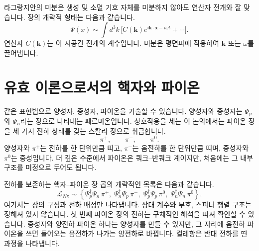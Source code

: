 라그랑지안의 미분은 생성 및 소멸 기호 자체를 미분하지 않아도 연산자 전개와 잘 맞습니다. 장의 개략적 형태는 다음과 같습니다.
\begin{equation}
\Psi(x)
\sim
\int d^3k\,
\bigl[
C(\mathbf k)e^{i\mathbf k\cdot\mathbf x-i\omega t}
+\cdots
\bigr].
\end{equation}
연산자 \(C(\mathbf k)\)는 이 시공간 전개의 계수입니다. 미분은 평면파에 작용하여 \(\mathbf k\) 또는 \(\omega\)를 끌어냅니다.

\begin{classroomqa}
\end{classroomqa}

\section{유효 이론으로서의 핵자와 파이온}

같은 표현법으로 양성자, 중성자, 파이온을 기술할 수 있습니다. 양성자와 중성자는 \(\Psi_p\)와 \(\Psi_n\)라는 장으로 나타내는 페르미온입니다. 상호작용을 세는 이 논의에서는 파이온 장을 세 가지 전하 상태를 갖는 스칼라 장으로 취급합니다.
\begin{equation}
\pi^+,
\qquad
\pi^-,
\qquad
\pi^0.
\end{equation}
양성자와 \(\pi^+\)는 전하를 한 단위만큼 띠고, \(\pi^-\)는 음전하를 한 단위만큼 띠며, 중성자와 \(\pi^0\)는 중성입니다. 더 깊은 수준에서 파이온은 쿼크--반쿼크 계이지만, 처음에는 그 내부 구조를 미정으로 두어도 됩니다.

전하를 보존하는 핵자--파이온 장 곱의 개략적인 목록은 다음과 같습니다.
\begin{equation}
\mathcal L_{N\pi}
\sim
\left\{
\Psi_p^\dagger\Psi_n\,\pi^+,\;
\Psi_n^\dagger\Psi_p\,\pi^-,\;
\Psi_p^\dagger\Psi_p\,\pi^0,\;
\Psi_n^\dagger\Psi_n\,\pi^0
\right\}.
\end{equation}
여기서는 장의 구성과 전하 배정만 나타냅니다. 상대 계수와 부호, 스피너 행렬 구조는 정해져 있지 않습니다. 첫 번째 파이온 장의 전하는 구체적인 해석을 따져 확인할 수 있습니다. 중성자와 양전하 파이온 하나는 양성자를 만들 수 있지만, 그 자리에 음전하 파이온을 쓰면 들어오는 음전하가 나가는 양전하로 바뀝니다. 켤레항은 반대 전하를 띤 과정을 나타냅니다.

